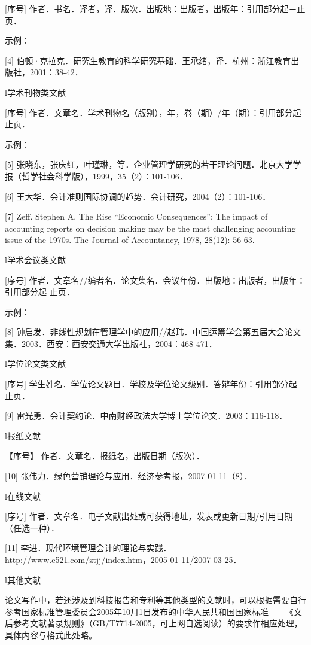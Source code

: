 \documentclass[doublesided]{Style/ucasthesis}%
\begin{document}
{[}序号{]} 作者．书名．译者，译．版次．出版地：出版者，出版年：引用部分起－止页．

示例：

{[}4{]} 伯顿·克拉克．研究生教育的科学研究基础．王承绪，译．杭州：浙江教育出版社，2001：38-42．

l学术刊物类文献

{[}序号{]} 作者．文章名．学术刊物名（版别），年，卷（期）/年（期）：引用部分起-止页．

示例：

{[}5{]} 张晓东，张庆红，叶瑾琳，等．企业管理学研究的若干理论问题．北京大学学报（哲学社会科学版），1999，35（2）：101-106．

{[}6{]} 王大华．会计准则国际协调的趋势．会计研究，2004（2）：101-106．

{[}7{]} Zeff. Stephen A. The Rise ``Economic Consequences'': The impact of accounting reports on decision making may be the most challenging accounting issue of the 1970s. The Journal of Accountancy, 1978, 28(12): 56-63.

l学术会议类文献

{[}序号{]} 作者．文章名//编者名．论文集名．会议年份．出版地：出版者，出版年：引用部分起-止页．

示例：

{[}8{]} 钟启发．非线性规划在管理学中的应用//赵玮．中国运筹学会第五届大会论文集．2003．西安：西安交通大学出版社，2004：468-471．

l学位论文类文献

{[}序号{]} 学生姓名．学位论文题目．学校及学位论文级别．答辩年份：引用部分起-止页．

{[}9{]} 雷光勇．会计契约论．中南财经政法大学博士学位论文．2003：116-118．

l报纸文献

【序号】 作者．文章名．报纸名，出版日期（版次）．

{[}10{]} 张伟力．绿色营销理论与应用．经济参考报，2007-01-11（8）．

l在线文献

{[}序号{]} 作者．文章名．电子文献出处或可获得地址，发表或更新日期/引用日期（任选一种）．

{[}11{]} 李进．现代环境管理会计的理论与实践．\url{http://www.e521.com/ztjj/index.htm，2005-01-11/2007-03-25}．

l其他文献

论文写作中，若还涉及到科技报告和专利等其他类型的文献时，可以根据需要自行参考国家标准管理委员会2005年10月1日发布的中华人民共和国国家标准------《文后参考文献著录规则》（GB/T7714-2005，可上网自选阅读）的要求作相应处理，具体内容与格式此处略。
\end{document}
